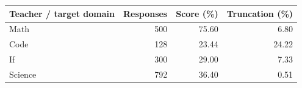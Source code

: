 \begin{tabular}{lrrr}
\toprule
Teacher / target domain & Responses & Score (\%) & Truncation (\%) \\
\midrule
Math & 500 & 75.60 & 6.80 \\
Code & 128 & 23.44 & 24.22 \\
If & 300 & 29.00 & 7.33 \\
Science & 792 & 36.40 & 0.51 \\
\bottomrule
\end{tabular}
